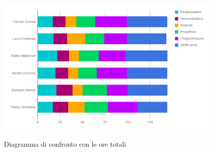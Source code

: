 			\begin{figure}[H]
					\centering
					\includegraphics[scale=0.58]{img/totale3.png}\\
					\caption{Diagramma di confronto con le ore totali}
			\end{figure}
